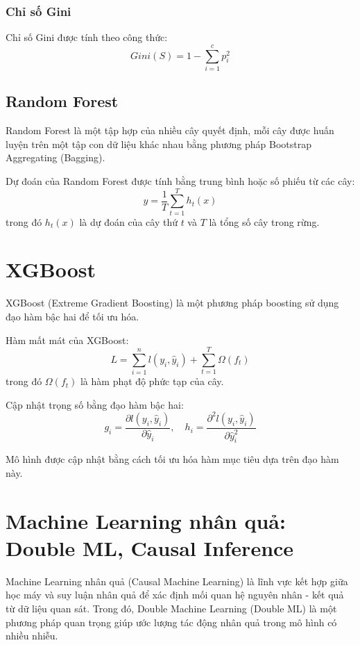 \subsubsection{Chỉ số Gini}
Chỉ số Gini được tính theo công thức:
\begin{equation}
    Gini(S) = 1 - \sum_{i=1}^{c} p_i^2
\end{equation}

\subsection{Random Forest}

Random Forest là một tập hợp của nhiều cây quyết định, mỗi cây được huấn luyện trên một tập con dữ liệu khác nhau bằng phương pháp Bootstrap Aggregating (Bagging).

Dự đoán của Random Forest được tính bằng trung bình hoặc số phiếu từ các cây:
\begin{equation}
    \hat{y} = \frac{1}{T} \sum_{t=1}^{T} h_t(x)
\end{equation}
trong đó $h_t(x)$ là dự đoán của cây thứ $t$ và $T$ là tổng số cây trong rừng.

\section{XGBoost}

XGBoost (Extreme Gradient Boosting) là một phương pháp boosting sử dụng đạo hàm bậc hai để tối ưu hóa.

Hàm mất mát của XGBoost:
\begin{equation}
    L = \sum_{i=1}^{n} l(y_i, \hat{y}_i) + \sum_{t=1}^{T} \Omega(f_t)
\end{equation}
trong đó $\Omega(f_t)$ là hàm phạt độ phức tạp của cây.

Cập nhật trọng số bằng đạo hàm bậc hai:
\begin{equation}
    g_i = \frac{\partial l(y_i, \hat{y}_i)}{\partial \hat{y}_i}, \quad h_i = \frac{\partial^2 l(y_i, \hat{y}_i)}{\partial \hat{y}_i^2}
\end{equation}

Mô hình được cập nhật bằng cách tối ưu hóa hàm mục tiêu dựa trên đạo hàm này.




\section{Machine Learning nhân quả: Double ML, Causal Inference}
Machine Learning nhân quả (Causal Machine Learning) là lĩnh vực kết hợp giữa học máy và suy luận nhân quả để xác định mối quan hệ nguyên nhân - kết quả từ dữ liệu quan sát. Trong đó, Double Machine Learning (Double ML) là một phương pháp quan trọng giúp ước lượng tác động nhân quả trong mô hình có nhiều nhiễu.

